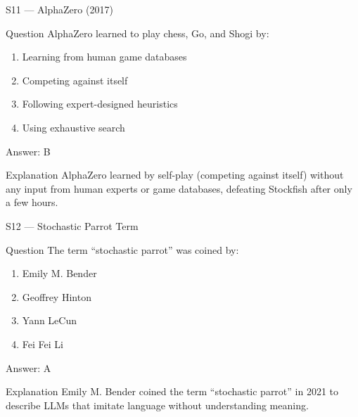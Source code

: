 \documentclass[aspectratio=169,8pt]{beamer}
\begin{document}
	\begin{frame}{S11 --- AlphaZero (2017)}
		\begin{block}{Question}
			AlphaZero learned to play chess, Go, and Shogi by:
			\begin{enumerate}
				\item Learning from human game databases
				\item Competing against itself
				\item Following expert-designed heuristics
				\item Using exhaustive search
			\end{enumerate}
		\end{block}
		\begin{exampleblock}{Answer: B}\end{exampleblock}
		\begin{block}{Explanation}
			AlphaZero learned by self-play (competing against itself) without any input from human experts or game databases, defeating Stockfish after only a few hours.
		\end{block}
	\end{frame}
	
	\begin{frame}{S12 --- Stochastic Parrot Term}
		\begin{block}{Question}
			The term ``stochastic parrot'' was coined by:
			\begin{enumerate}
				\item Emily M. Bender
				\item Geoffrey Hinton
				\item Yann LeCun
				\item Fei Fei Li
			\end{enumerate}
		\end{block}
		\begin{exampleblock}{Answer: A}\end{exampleblock}
		\begin{block}{Explanation}
			Emily M. Bender coined the term ``stochastic parrot'' in 2021 to describe LLMs that imitate language without understanding meaning.
		\end{block}
	\end{frame}
	
\end{document}
